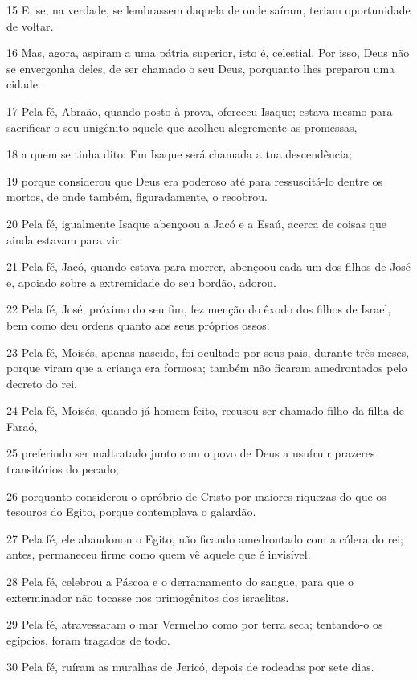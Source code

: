 \par 15 E, se, na verdade, se lembrassem daquela de onde saíram, teriam oportunidade de voltar.
\par 16 Mas, agora, aspiram a uma pátria superior, isto é, celestial. Por isso, Deus não se envergonha deles, de ser chamado o seu Deus, porquanto lhes preparou uma cidade.
\par 17 Pela fé, Abraão, quando posto à prova, ofereceu Isaque; estava mesmo para sacrificar o seu unigênito aquele que acolheu alegremente as promessas,
\par 18 a quem se tinha dito: Em Isaque será chamada a tua descendência;
\par 19 porque considerou que Deus era poderoso até para ressuscitá-lo dentre os mortos, de onde também, figuradamente, o recobrou.
\par 20 Pela fé, igualmente Isaque abençoou a Jacó e a Esaú, acerca de coisas que ainda estavam para vir.
\par 21 Pela fé, Jacó, quando estava para morrer, abençoou cada um dos filhos de José e, apoiado sobre a extremidade do seu bordão, adorou.
\par 22 Pela fé, José, próximo do seu fim, fez menção do êxodo dos filhos de Israel, bem como deu ordens quanto aos seus próprios ossos.
\par 23 Pela fé, Moisés, apenas nascido, foi ocultado por seus pais, durante três meses, porque viram que a criança era formosa; também não ficaram amedrontados pelo decreto do rei.
\par 24 Pela fé, Moisés, quando já homem feito, recusou ser chamado filho da filha de Faraó,
\par 25 preferindo ser maltratado junto com o povo de Deus a usufruir prazeres transitórios do pecado;
\par 26 porquanto considerou o opróbrio de Cristo por maiores riquezas do que os tesouros do Egito, porque contemplava o galardão.
\par 27 Pela fé, ele abandonou o Egito, não ficando amedrontado com a cólera do rei; antes, permaneceu firme como quem vê aquele que é invisível.
\par 28 Pela fé, celebrou a Páscoa e o derramamento do sangue, para que o exterminador não tocasse nos primogênitos dos israelitas.
\par 29 Pela fé, atravessaram o mar Vermelho como por terra seca; tentando-o os egípcios, foram tragados de todo.
\par 30 Pela fé, ruíram as muralhas de Jericó, depois de rodeadas por sete dias.
